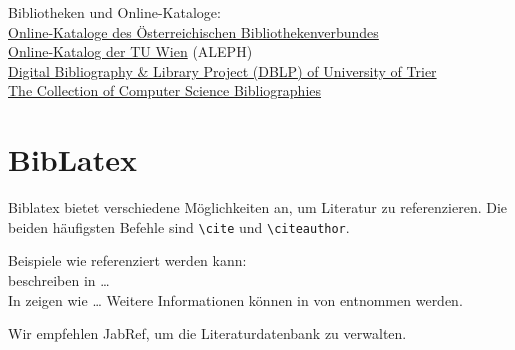 Bibliotheken und Online-Kataloge:\\
\href{http://search.obvsg.at/primo_library/libweb/action/search.do?vid=ACC}{Online-Kataloge des Österreichischen Bibliothekenverbundes}\\
\href{http://aleph.ub.tuwien.ac.at/}{Online-Katalog der TU Wien} (ALEPH)\\
\href{http://www.informatik.uni-trier.de/}{Digital Bibliography \& Library Project (DBLP) of University of Trier}\\
\href{http://liinwww.ira.uka.de/bibliography/}{The Collection of Computer Science Bibliographies}

\section{BibLatex}

Biblatex bietet verschiedene Möglichkeiten an, um Literatur zu referenzieren. Die beiden häufigsten Befehle sind \verb|\cite| und \verb|\citeauthor|.

Beispiele wie referenziert werden kann:\\
\citeauthor{fankhauser:2009:softwaretechnik-security} beschreiben in \cite{fankhauser:2009:softwaretechnik-security} \dots\\
In \cite{schanes:2011:voip-fuzzer} zeigen \citeauthor{schanes:2011:voip-fuzzer} wie \dots
Weitere Informationen können in \cite{oasis:2010:homepage} von \citeauthor{oasis:2010:homepage} entnommen werden.

Wir empfehlen JabRef, um die Literaturdatenbank zu verwalten.
